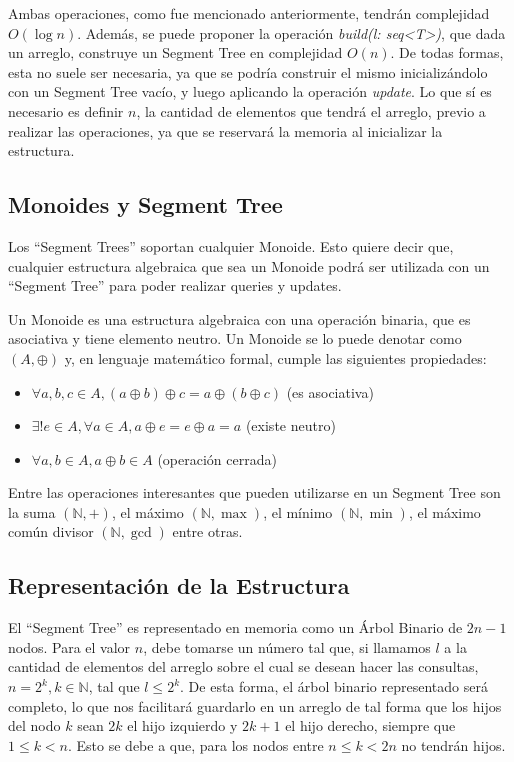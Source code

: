 \documentclass{article}
\begin{document}
Ambas operaciones, como fue mencionado anteriormente, tendrán complejidad $O(\log n)$. Además, se puede proponer la operación \textit{build(l: seq<T>)}, que dada un arreglo, construye un Segment Tree en complejidad $O(n)$. De todas formas, esta no suele ser necesaria, ya que se podría construir el mismo inicializándolo con un Segment Tree vacío, y luego aplicando la operación \textit{update}. Lo que sí es necesario es definir $n$, la cantidad de elementos que tendrá el arreglo, previo a realizar las operaciones, ya que se reservará la memoria al inicializar la estructura.

\subsection{Monoides y Segment Tree}

Los ``Segment Trees'' soportan cualquier Monoide. Esto quiere decir que, cualquier estructura algebraica que sea un Monoide podrá ser utilizada con un ``Segment Tree'' para poder realizar queries y updates.

Un Monoide es una estructura algebraica con una operación binaria, que es asociativa y tiene elemento neutro. Un Monoide se lo puede denotar como $(A, \oplus)$ y, en lenguaje matemático formal, cumple las siguientes propiedades:

\begin{itemize}
    \item $\forall a,b,c \in A, (a \oplus b) \oplus c = a \oplus (b \oplus c)$ (es asociativa)
    \item $\exists !e \in A, \forall a \in A, a \oplus e = e \oplus a = a$ (existe neutro)
    \item $\forall a,b \in A, a \oplus b \in A$ (operación cerrada)
\end{itemize}

Entre las operaciones interesantes que pueden utilizarse en un Segment Tree son la suma $(\mathbb{N}, +)$, el máximo $(\mathbb{N}, \max)$, el mínimo $(\mathbb{N}, \min)$, el máximo común divisor $(\mathbb{N}, \gcd)$ entre otras.

\subsection{Representación de la Estructura}

El ``Segment Tree'' es representado en memoria como un Árbol Binario de $2n - 1$ nodos. Para el valor $n$, debe tomarse un número tal que, si llamamos $l$ a la cantidad de elementos del arreglo sobre el cual se desean hacer las consultas, $n = 2^k, k \in \mathbb{N}$, tal que $l \leq 2^{k}$. De esta forma, el árbol binario representado será completo, lo que nos facilitará guardarlo en un arreglo de tal forma que los hijos del nodo $k$ sean $2k$ el hijo izquierdo y $2k + 1$ el hijo derecho, siempre que $1 \leq k < n$. Esto se debe a que, para los nodos entre $n \leq k < 2n$ no tendrán hijos.
\end{document}
